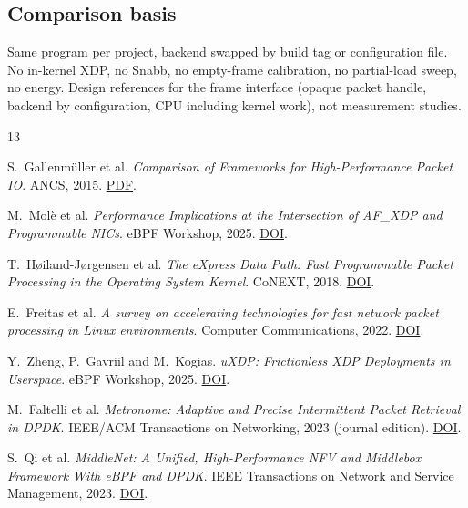 \documentclass[11pt,a4paper]{article}
\begin{document}
\subsection*{\normalsize\normalfont Comparison basis}
Same program per project, backend swapped by build tag or configuration file.
No in-kernel XDP, no Snabb, no empty-frame calibration, no partial-load sweep, no energy.
Design references for the frame interface (opaque packet handle, backend by configuration, CPU including kernel work), not measurement studies.
\par
\endgroup

\clearpage
\begin{thebibliography}{13}
\footnotesize
\setlength{\itemsep}{3pt}

S.~Gallenmüller et al.
\emph{Comparison of Frameworks for High-Performance Packet IO}.
ANCS, 2015.
\href{https://www.net.in.tum.de/fileadmin/bibtex/publications/papers/gallenmueller_ancs2015.pdf}{PDF}.

M.~Molè et al.
\emph{Performance Implications at the Intersection of AF\_XDP and Programmable NICs}.
eBPF Workshop, 2025.
\href{https://doi.org/10.1145/3748355.3748359}{DOI}.

T.~Høiland-Jørgensen et al.
\emph{The eXpress Data Path: Fast Programmable Packet Processing in the Operating System Kernel}.
CoNEXT, 2018.
\href{https://doi.org/10.1145/3281411.3281443}{DOI}.

E.~Freitas et al.
\emph{A survey on accelerating technologies for fast network packet processing in Linux environments}.
Computer Communications, 2022.
\href{https://doi.org/10.1016/j.comcom.2022.10.003}{DOI}.

Y.~Zheng, P.~Gavriil and M.~Kogias.
\emph{uXDP: Frictionless XDP Deployments in Userspace}.
eBPF Workshop, 2025.
\href{https://doi.org/10.1145/3748355.3748360}{DOI}.

M.~Faltelli et al.
\emph{Metronome: Adaptive and Precise Intermittent Packet Retrieval in DPDK}.
IEEE/ACM Transactions on Networking, 2023 (journal edition).
\href{https://doi.org/10.1109/TNET.2022.3208799}{DOI}.

S.~Qi et al.
\emph{MiddleNet: A Unified, High-Performance NFV and Middlebox Framework With eBPF and DPDK}.
IEEE Transactions on Network and Service Management, 2023.
\href{https://doi.org/10.1109/TNSM.2023.3256891}{DOI}.


\end{thebibliography}
\end{document}
